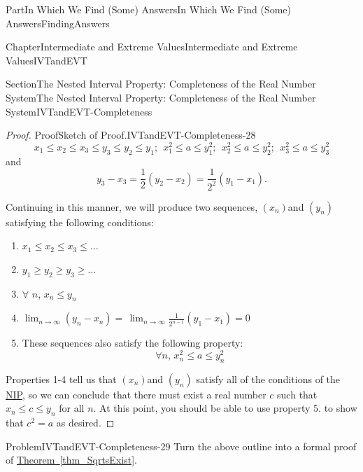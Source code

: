 \documentclass[oneside,10pt,]{book}
\newcommand{\xreffont}{\relax}
\numberwithin{equation}{part}
\begin{document}
\begin{partptx}{Part}{In Which We Find (Some) Answers}{}{In Which We Find (Some) Answers}{}{}{FindingAnswers}
\begin{chapterptx}{Chapter}{Intermediate and Extreme Values}{}{Intermediate and Extreme Values}{}{}{IVTandEVT}
\begin{sectionptx}{Section}{The Nested Interval Property: Completeness of the Real Number System}{}{The Nested Interval Property: Completeness of the Real Number System}{}{}{IVTandEVT-Completeness}
\begin{proof}{Proof}{Sketch of Proof.}{IVTandEVT-Completeness-28}
\begin{equation*}
x_1\leq x_2\leq x_3\leq y_3\leq y_2\leq y_1;\ \   x_1^2\leq a\leq y_1^2;\ \  x_2^2\leq a\leq y_2^2;\ \   x_3^2\leq a\leq y_3^2
\end{equation*}
and%
\begin{equation*}
y_3-x_3=\frac{1}{2}\left(y_2-x_2\right)=\frac{1}{2^2}\left(y_1-x_1\right)\text{.}
\end{equation*}
%
\par
Continuing in this manner, we will produce two sequences, \(\left(x_n\right)\)and \(\left(y_n\right)\) satisfying the following conditions:%
\begin{enumerate}
\item{}\(\displaystyle x_1\leq x_2\leq x_3\leq\ldots\)%
\item{}\(\displaystyle y_1\geq y_2\geq y_3\geq\ldots\)%
\item{}\(\forall\) \(n\), \(x_n\leq y_n\)%
\item{}\(\displaystyle \lim_{n\rightarrow\infty}\left(y_n-x_n\right)=\,\lim_{n\rightarrow\infty}\frac{1}{2^{n-1}}\left(y_1-x_1\right)=0\)%
\item{}These sequences also satisfy the following property:%
\begin{equation*}
\forall n,\,x_n^2\leq a\leq y_n^2
\end{equation*}
%
\end{enumerate}
%
\par
Properties 1-4 tell us that \(\left(x_n\right)\)and \(\left(y_n\right)\) satisfy all of the conditions of the \hyperref[NIP]{NIP}, so we can conclude that there must exist a real number \(c\) such that \(x_n\leq c\leq y_n\) for all \(n\). At this point, you should be able to use property 5. to show that \(c^2=a\) as desired.%
\end{proof}
\begin{problem}{Problem}{}{IVTandEVT-Completeness-29}%
 Turn the above outline into a formal proof of \hyperref[thm_SqrtsExist]{Theorem~{\xreffont\ref{thm_SqrtsExist}}}.%
\end{problem}

\end{sectionptx}
\end{chapterptx}
\end{partptx}
\end{document}
